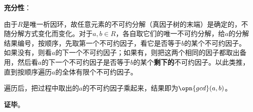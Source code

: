 \textbf{充分性}：

由于$R$是唯一析因环，故任意元素的不可约分解（真因子树的末端）是确定的，不随分解方式变化而变化。对于$a, b\in R$，各自取它们的唯一不可约分解，给$a$的分解结果编号，按顺序，先取第一个不可约因子，看它是否等于$b$的某个不可约因子。如果没有，则看$a$的下一个不可约因子；如果有，则把这两个相同的因子都取出备用，然后看$a$的下一个不可约因子是否等于$b$的某个\textbf{剩下的}不可约因子。以此类推，直到按顺序遍历$a$的全体有限个不可约因子。

遍历后，把过程中取出的$a$的不可约因子乘起来，结果即为$\opn{gcd}(a, b)$。

\textbf{证毕}。








































